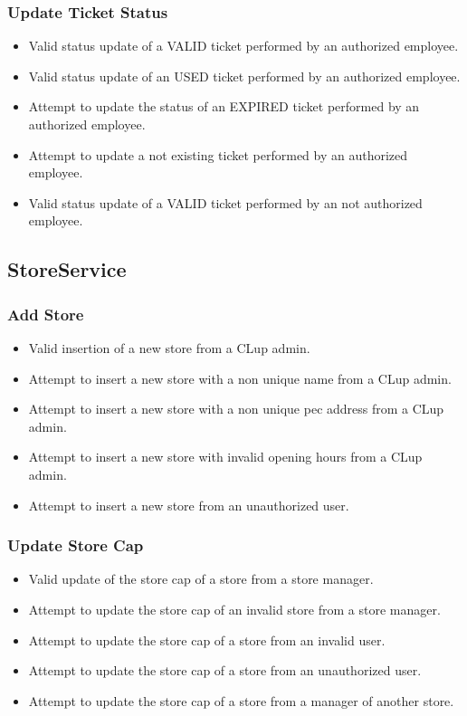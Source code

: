 \subsubsection{Update Ticket Status}
\begin{itemize}
	\item Valid status update of a VALID ticket performed by an authorized employee.
	\item Valid status update of an USED ticket performed by an authorized employee.
	\item Attempt to update the status of an EXPIRED ticket performed by an authorized employee.
	\item Attempt to update a not existing ticket performed by an authorized employee.
	\item Valid status update of a VALID ticket performed by an not authorized employee.
\end{itemize}

\subsection{StoreService}
\subsubsection{Add Store}
\begin{itemize}
	\item Valid insertion of a new store from a CLup admin.
	\item Attempt to insert a new store with a non unique name from a CLup admin.
	\item Attempt to insert a new store with a non unique pec address from a CLup admin.
	\item Attempt to insert a new store with invalid opening hours from a CLup admin.
	\item Attempt to insert a new store from an unauthorized user.
\end{itemize}

\subsubsection{Update Store Cap}
\begin{itemize}
	\item Valid update of the store cap of a store from a store manager.
	\item Attempt to update the store cap of an invalid store from a store manager.
	\item Attempt to update the store cap of a store from an invalid user.
	\item Attempt to update the store cap of a store from an unauthorized user.
	\item Attempt to update the store cap of a store from a manager of another store.
\end{itemize}